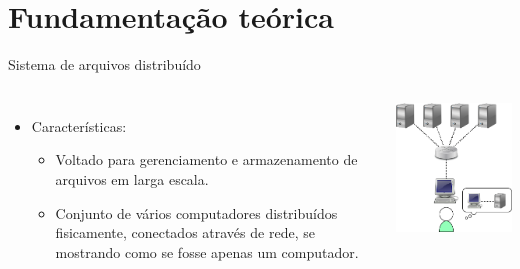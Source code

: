 \section{Fundamentação teórica}

\begin{frame}{Sistema de arquivos distribuído}
	
	\begin{columns}
		
		\begin{itemize}
			\item Características:
			
			\begin{itemize}
				\item Voltado para gerenciamento e armazenamento de arquivos em larga escala.
				\item Conjunto de vários computadores distribuídos fisicamente, conectados através de rede, se mostrando como se fosse apenas um computador.
			\end{itemize}
		\end{itemize}
		
		
		\includegraphics[width=\textwidth]{imagens/sad}
	\end{columns}
\end{frame}
	
